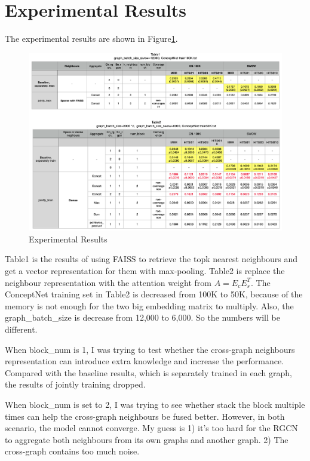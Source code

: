 \section{Experimental Results}
The experimental results are shown in Figure\ref{fig:experimental_results}. 
\begin{figure}
    \includegraphics[scale=0.36]{images/0512/results-2020-05-12.png}
    \caption{Experimental Results}
    \label{fig:experimental_results}
\end{figure}

Table1 is the results of using FAISS to retrieve the topk nearest neighbours and get a vector representation for them with max-pooling. 
Table2 is replace the neighbour representation with the attention weight from $A=E_c E_s^T$. The ConceptNet training set in Table2 is decreased from 100K to 50K, because of the memory is not enough for the two big embedding matrix to multiply. Also, the graph\_batch\_size is decrease from 12,000 to 6,000. So the numbers will be different.

When block\_num is 1, I was trying to test whether the cross-graph neighbours representation can introduce extra knowledge and increase the performance. Compared with the baseline results, which is separately trained in each graph, the results of jointly training dropped. 

When block\_num is set to 2, I was trying to see whether stack the block multiple times can help the cross-graph neighbours be fused better. However, in both scenario, the model cannot converge. My guess is 1) it's too hard for the RGCN to aggregate both neighbours from its own graphs and another graph. 2) The cross-graph contains too much noise. 

